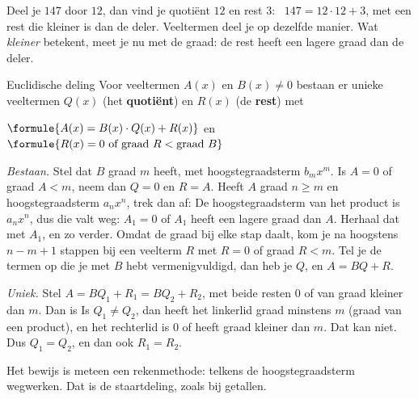Deel je $147$ door $12$, dan vind je quotiënt $12$ en rest $3$: \ $147 = 12 \cdot 12 + 3$, met een rest die kleiner is dan de deler. Veeltermen deel je op dezelfde manier. Wat \textit{kleiner} betekent, meet je nu met de graad: de rest heeft een lagere graad dan de deler.

\begin{theorie}
\begin{stelling}{Euclidische deling}
Voor veeltermen $A(x)$ en $B(x) \neq 0$ bestaan er unieke veeltermen $Q(x)$ (het \textbf{\textcolor{accent}{quotiënt}}) en $R(x)$ (de \textbf{\textcolor{accent}{rest}}) met

\qquad $\formule{A(x) = B(x) \cdot Q(x) + R(x)}$ \quad en \quad $\formule{R(x) = 0 \text{ of graad } R < \text{graad } B}$
\end{stelling}

\begin{bewijs}
\textit{Bestaan.} Stel dat $B$ graad $m$ heeft, met hoogstegraadsterm $b_m x^m$. Is $A = 0$ of graad $A < m$, neem dan $Q = 0$ en $R = A$. Heeft $A$ graad $n \geqslant m$ en hoogstegraadsterm $a_n x^n$, trek dan af:
De hoogstegraadsterm van het product is $a_n x^n$, dus die valt weg: $A_1 = 0$ of $A_1$ heeft een lagere graad dan $A$. Herhaal dat met $A_1$, en zo verder. Omdat de graad bij elke stap daalt, kom je na hoogstens $n - m + 1$ stappen bij een veelterm $R$ met $R = 0$ of graad $R < m$. Tel je de termen op die je met $B$ hebt vermenigvuldigd, dan heb je $Q$, en $A = BQ + R$.

\textit{Uniek.} Stel $A = BQ_1 + R_1 = BQ_2 + R_2$, met beide resten $0$ of van graad kleiner dan $m$. Dan is
Is $Q_1 \neq Q_2$, dan heeft het linkerlid graad minstens $m$ (graad van een product), en het rechterlid is $0$ of heeft graad kleiner dan $m$. Dat kan niet. Dus $Q_1 = Q_2$, en dan ook $R_1 = R_2$.
\end{bewijs}
\end{theorie}

Het bewijs is meteen een rekenmethode: telkens de hoogstegraadsterm wegwerken. Dat is de staartdeling, zoals bij getallen.


